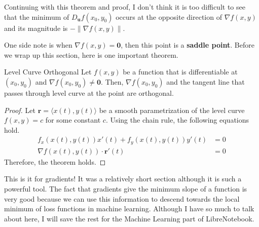 \documentclass[../../../main.tex]{subfiles}
\begin{document}
Continuing with this theorem and proof, I don't think it is too
difficult to see that the minimum of $D_\mathbf{u} f(x_0, y_0)$ occurs
at the opposite direction of $\nabla f(x, y)$ and its magnitude is
$-\| \nabla f(x, y) \|$.

One side note is when $\nabla f(x, y) = \mathbf{0}$, then this point
is a \textbf{saddle point}. Before we wrap up this section,
here is one important theorem.

\begin{theorem}{}{Level Curve Orthogonal}
Let $f(x, y)$ be a function that is differentiable at $(x_0, y_0)$ and
$\nabla f(x_0, y_0) \neq \mathbf{0}$. Then, $\nabla f(x_0, y_0)$ and
the tangent line that passes through level curve at the point are
orthogonal.
\end{theorem}
\begin{proof}
Let $\mathbf{r} = \langle x(t), y(t) \rangle$ be a smooth
parametrization of the level curve $f(x, y) = c$ for some constant
$c$. Using the chain rule, the following equations hold.
\begin{align*}
    f_x(x(t), y(t)) x'(t) + f_y(x(t), y(t)) y'(t) &= 0 \\
    \nabla f(x(t), y(t)) \cdot \mathbf{r}'(t) &= 0
\end{align*}
Therefore, the theorem holds.
\end{proof}

This is it for gradients! It was a relatively short section although
it is such a powerful tool. The fact that gradients give the minimum
slope of a function is very good because we can use this information
to descend towards the local minimum of loss functions in machine
learning. Although I have so much to talk about here, I will save the
rest for the Machine Learning part of LibreNotebook.
\end{document}
